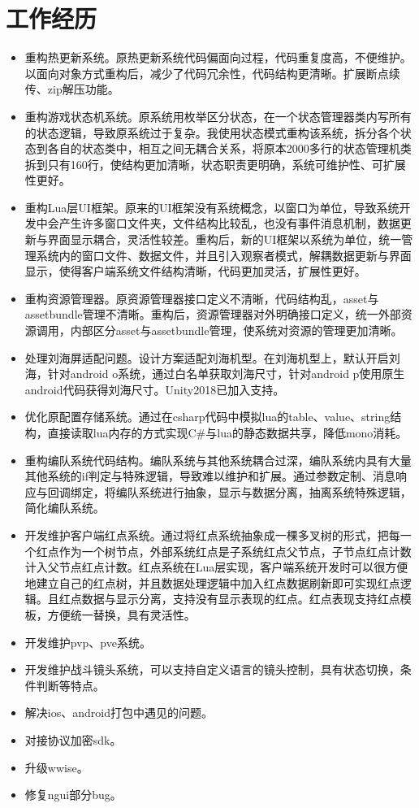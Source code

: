 \documentclass{resume}
\begin{document}
\section{工作经历}
\begin{itemize}
  \item 重构热更新系统。原热更新系统代码偏面向过程，代码重复度高，不便维护。以面向对象方式重构后，减少了代码冗余性，代码结构更清晰。扩展断点续传、zip解压功能。
  \item 重构游戏状态机系统。原系统用枚举区分状态，在一个状态管理器类内写所有的状态逻辑，导致原系统过于复杂。我使用状态模式重构该系统，拆分各个状态到各自的状态类中，相互之间无耦合关系，将原本2000多行的状态管理机类拆到只有160行，使结构更加清晰，状态职责更明确，系统可维护性、可扩展性更好。
  \item 重构Lua层UI框架。原来的UI框架没有系统概念，以窗口为单位，导致系统开发中会产生许多窗口文件夹，文件结构比较乱，也没有事件消息机制，数据更新与界面显示耦合，灵活性较差。重构后，新的UI框架以系统为单位，统一管理系统内的窗口文件、数据文件，并且引入观察者模式，解耦数据更新与界面显示，使得客户端系统文件结构清晰，代码更加灵活，扩展性更好。
  \item 重构资源管理器。原资源管理器接口定义不清晰，代码结构乱，asset与assetbundle管理不清晰。重构后，资源管理器对外明确接口定义，统一外部资源调用，内部区分asset与assetbundle管理，使系统对资源的管理更加清晰。
  \item 处理刘海屏适配问题。设计方案适配刘海机型。在刘海机型上，默认开启刘海，针对android o系统，通过白名单获取刘海尺寸，针对android p使用原生android代码获得刘海尺寸。Unity2018已加入支持。
  \item 优化原配置存储系统。通过在csharp代码中模拟lua的table、value、string结构，直接读取lua内存的方式实现C#与lua的静态数据共享，降低mono消耗。
  \item 重构编队系统代码结构。编队系统与其他系统耦合过深，编队系统内具有大量其他系统的if判定与特殊逻辑，导致难以维护和扩展。通过参数定制、消息响应与回调绑定，将编队系统进行抽象，显示与数据分离，抽离系统特殊逻辑，简化编队系统。
  \item 开发维护客户端红点系统。通过将红点系统抽象成一棵多叉树的形式，把每一个红点作为一个树节点，外部系统红点是子系统红点父节点，子节点红点计数计入父节点红点计数。红点系统在Lua层实现，客户端系统开发时可以很方便地建立自己的红点树，并且数据处理逻辑中加入红点数据刷新即可实现红点逻辑。且红点数据与显示分离，支持没有显示表现的红点。红点表现支持红点模板，方便统一替换，具有灵活性。
  \item 开发维护pvp、pve系统。
  \item 开发维护战斗镜头系统，可以支持自定义语言的镜头控制，具有状态切换，条件判断等特点。
  \item 解决ios、android打包中遇见的问题。
  \item 对接协议加密sdk。
  \item 升级wwise。
  \item 修复ngui部分bug。
\end{itemize}
\end{document}
